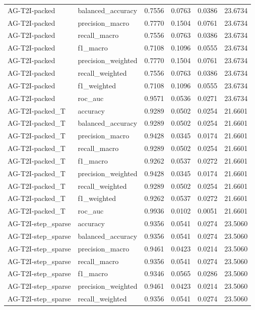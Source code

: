 \begin{tabular}{llrrrr}
AG-T2I-packed & balanced_accuracy & 0.7556 & 0.0763 & 0.0386 & 23.6734 \\
AG-T2I-packed & precision_macro & 0.7770 & 0.1504 & 0.0761 & 23.6734 \\
AG-T2I-packed & recall_macro & 0.7556 & 0.0763 & 0.0386 & 23.6734 \\
AG-T2I-packed & f1_macro & 0.7108 & 0.1096 & 0.0555 & 23.6734 \\
AG-T2I-packed & precision_weighted & 0.7770 & 0.1504 & 0.0761 & 23.6734 \\
AG-T2I-packed & recall_weighted & 0.7556 & 0.0763 & 0.0386 & 23.6734 \\
AG-T2I-packed & f1_weighted & 0.7108 & 0.1096 & 0.0555 & 23.6734 \\
AG-T2I-packed & roc_auc & 0.9571 & 0.0536 & 0.0271 & 23.6734 \\
AG-T2I-packed_T & accuracy & 0.9289 & 0.0502 & 0.0254 & 21.6601 \\
AG-T2I-packed_T & balanced_accuracy & 0.9289 & 0.0502 & 0.0254 & 21.6601 \\
AG-T2I-packed_T & precision_macro & 0.9428 & 0.0345 & 0.0174 & 21.6601 \\
AG-T2I-packed_T & recall_macro & 0.9289 & 0.0502 & 0.0254 & 21.6601 \\
AG-T2I-packed_T & f1_macro & 0.9262 & 0.0537 & 0.0272 & 21.6601 \\
AG-T2I-packed_T & precision_weighted & 0.9428 & 0.0345 & 0.0174 & 21.6601 \\
AG-T2I-packed_T & recall_weighted & 0.9289 & 0.0502 & 0.0254 & 21.6601 \\
AG-T2I-packed_T & f1_weighted & 0.9262 & 0.0537 & 0.0272 & 21.6601 \\
AG-T2I-packed_T & roc_auc & 0.9936 & 0.0102 & 0.0051 & 21.6601 \\
AG-T2I-step_sparse & accuracy & 0.9356 & 0.0541 & 0.0274 & 23.5060 \\
AG-T2I-step_sparse & balanced_accuracy & 0.9356 & 0.0541 & 0.0274 & 23.5060 \\
AG-T2I-step_sparse & precision_macro & 0.9461 & 0.0423 & 0.0214 & 23.5060 \\
AG-T2I-step_sparse & recall_macro & 0.9356 & 0.0541 & 0.0274 & 23.5060 \\
AG-T2I-step_sparse & f1_macro & 0.9346 & 0.0565 & 0.0286 & 23.5060 \\
AG-T2I-step_sparse & precision_weighted & 0.9461 & 0.0423 & 0.0214 & 23.5060 \\
AG-T2I-step_sparse & recall_weighted & 0.9356 & 0.0541 & 0.0274 & 23.5060 \\

\end{tabular}
